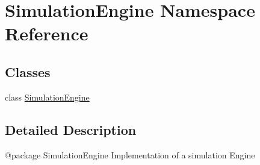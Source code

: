 \hypertarget{namespace_simulation_engine}{}\section{Simulation\+Engine Namespace Reference}
\label{namespace_simulation_engine}
\subsection*{Classes}
\begin{DoxyCompactItemize}
\item 
class \mbox{\hyperlink{class_simulation_engine_1_1_simulation_engine}{Simulation\+Engine}}
\end{DoxyCompactItemize}


\subsection{Detailed Description}
\begin{DoxyVerb}@package SimulationEngine
Implementation of a simulation Engine
\end{DoxyVerb}
 